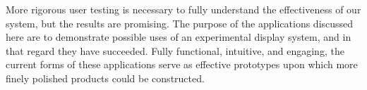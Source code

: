 \documentclass{thesis}
\begin{document}
More rigorous user testing is necessary to fully understand the effectiveness of our system, but the results are promising. The purpose of the applications discussed here are to demonstrate possible uses of an experimental display system, and in that regard they have succeeded. Fully functional, intuitive, and engaging, the current forms of these applications serve as effective prototypes upon which more finely polished products could be constructed.

\begin{singlespace}

{}


\end{singlespace}


\end{document}
